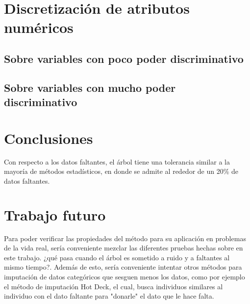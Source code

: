 \documentclass[]{article}
\begin{document}
\section{Discretización de atributos numéricos}

\subsection{Sobre variables con poco poder discriminativo}

\subsection{Sobre variables con mucho poder discriminativo}

\section*{Conclusiones}
Con respecto a los datos faltantes, el árbol tiene una tolerancia similar a la mayoría de métodos estadísticos, en donde se admite al rededor de un 20\% de datos faltantes. 

\section*{Trabajo futuro}
Para poder verificar las propiedades del método para su aplicación en problemas de la vida real, sería conveniente mezclar las diferentes pruebas hechas sobre en este trabajo. ¿qué pasa cuando el árbol es sometido a ruido y a faltantes al mismo tiempo?. Además de esto, sería conveniente intentar otros métodos para imputación de datos categóricos que sesguen menos los datos, como por ejemplo el método de imputación Hot Deck, el cual, busca individuos similares al individuo con el dato faltante para "donarle" el dato que le hace falta. \cite{Rodgers1984}

	




\end{document}
